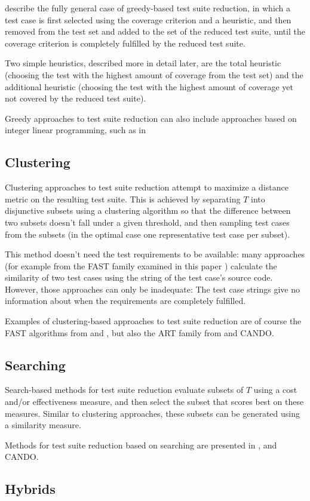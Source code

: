 \cite{khan2018systematic} describe the fully general case of greedy-based
test suite reduction, in which a test case is first selected using
the coverage criterion and a heuristic, and then removed from the test
set and added to the set of the reduced test suite, until the coverage
criterion is completely fulfilled by the reduced test suite.

Two simple heuristics, described more in detail later, are the total
heuristic (choosing the test with the highest amount of coverage from
the test set) and the additional heuristic (choosing the test with the
highest amount of coverage yet not covered by the reduced test suite).

Greedy approaches to test suite reduction can also include approaches
based on integer linear programming, such as in %


\subsection{Clustering}

Clustering approaches to test suite reduction attempt to maximize
a distance metric on the resulting test suite. This is achieved by
separating $T$ into disjunctive subsets using a clustering algorithm
so that the difference between two subsets doesn't fall under a given %
threshold, and then sampling test cases from the subsets (in the optimal
case one representative test case per subset).

This method doesn't need the test requirements to be available: many
approaches (for example from the FAST family examined in this paper
\cite{miranda2018fast}) calculate the similarity of two test cases using
the string of the test case's source code. However, those approaches can
only be inadequate: The test case strings give no information about when
the requirements are completely fulfilled.

Examples of clustering-based approaches to test suite reduction are
of course the FAST algorithms from \cite{cruciani2019scalable}
and \cite{miranda2018fast}, but also the ART family from
\cite{chen2010adaptive} and CANDO.


\subsection{Searching}

Search-based methods for test suite reduction evaluate subsets of $T$
using a cost and/or effectiveness measure, and then select the subset
that scores best on these measures. Similar to clustering approaches,
these subsets can be generated using a similarity measure.

Methods for test suite reduction based on searching are presented in
\cite{coutinho2013test}, and CANDO.

\subsection{Hybrids}
